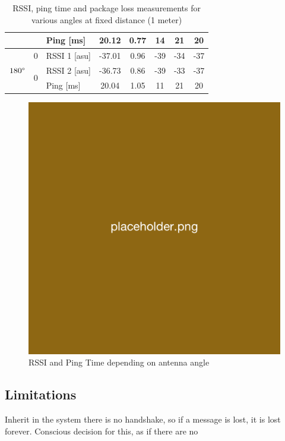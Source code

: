 \begin{table}[H]
\begin{tabular}{|c|c|l|c|c|c|c|c|}
        && Ping [ms] & 20.12 & 0.77 & 14 & 21 & 20 \\\hline\hline
        \multirow{3}{*}{$180\degree$} & \multirow{1}{*}{0} & RSSI 1 [asu] & -37.01 & 0.96 & -39 & -34 & -37 \\\cline{2-8}\cline{2-8}
        & \multirow{2}{*}{0} & RSSI 2 [asu] & -36.73 & 0.86 & -39 & -33 & -37 \\\cline{3-8}
        && Ping [ms] & 20.04 & 1.05 & 11 & 21 & 20 \\\hline
    \end{tabular}
    \vspace{\ftspace}
    \caption{RSSI, ping time and package loss measurements for various angles at fixed distance (1 meter)}
    \label{tab:angle_res}
\end{table}

\begin{figure}[H]
    \centering
    \includegraphics[width=0.5\linewidth]{overleaf/images/placeholder.png}
    \vspace{\ftspace}
    \caption{RSSI and Ping Time depending on antenna angle}
    \label{fig:antennaangle}
\end{figure}


\subsection{\label{sec:res_limitations}Limitations}


Inherit in the system there is no handshake, so if a message is lost, it is lost forever. Conscious decision for this, as if there are no 



